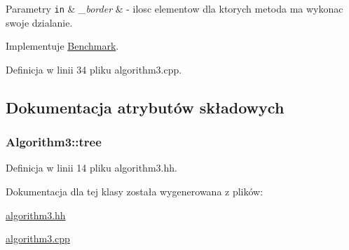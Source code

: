 \begin{DoxyParams}[1]{Parametry}
\mbox{\tt in}  & {\em \-\_\-border} & -\/ ilosc elementow dla ktorych metoda ma wykonac swoje dzialanie. \\
\hline
\end{DoxyParams}


Implementuje \hyperlink{class_benchmark_a2dcfb6ee9e648ae88d8c131b2b191bed}{Benchmark}.



Definicja w linii 34 pliku algorithm3.\-cpp.



\subsection{Dokumentacja atrybutów składowych}
\hypertarget{class_algorithm3_a258233c4774afd7d6e6d5a1198955556}{
\subsubsection[{tree}]{ Algorithm3\-::tree\hspace{0.3cm}{\ttfamily [private]}}}\label{class_algorithm3_a258233c4774afd7d6e6d5a1198955556}


Definicja w linii 14 pliku algorithm3.\-hh.



Dokumentacja dla tej klasy została wygenerowana z plików\-:\begin{DoxyCompactItemize}
\item 
\hyperlink{algorithm3_8hh}{algorithm3.\-hh}\item 
\hyperlink{algorithm3_8cpp}{algorithm3.\-cpp}\end{DoxyCompactItemize}
